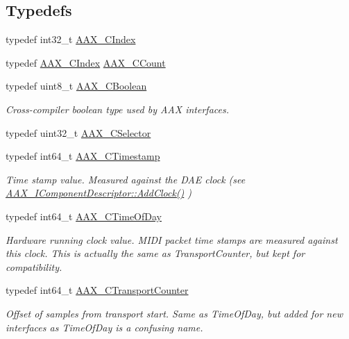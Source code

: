 \subsection*{Typedefs}
\begin{DoxyCompactItemize}
\item 
typedef int32\+\_\+t \hyperlink{a00149_a24ac375fa55ccadbc3126e6d81146c28}{A\+A\+X\+\_\+\+C\+Index}
\item 
typedef \hyperlink{a00149_a24ac375fa55ccadbc3126e6d81146c28}{A\+A\+X\+\_\+\+C\+Index} \hyperlink{a00149_a9a9a14ab1486fa8c6734b96976be3056}{A\+A\+X\+\_\+\+C\+Count}
\item 
typedef uint8\+\_\+t \hyperlink{a00149_aa216506530f1d19a2965931ced2b274b}{A\+A\+X\+\_\+\+C\+Boolean}
\begin{DoxyCompactList}\small\item\em Cross-\/compiler boolean type used by A\+A\+X interfaces. \end{DoxyCompactList}\item 
typedef uint32\+\_\+t \hyperlink{a00149_aeaf9b387f902c50a8360ff423f4a1f23}{A\+A\+X\+\_\+\+C\+Selector}
\item 
typedef int64\+\_\+t \hyperlink{a00149_aae7325dbfa53a983f208a68cb563fba5}{A\+A\+X\+\_\+\+C\+Timestamp}
\begin{DoxyCompactList}\small\item\em Time stamp value. Measured against the D\+A\+E clock (see \hyperlink{a00088_a59727dee1043fcd7f14da130ab254445}{A\+A\+X\+\_\+\+I\+Component\+Descriptor\+::\+Add\+Clock()} ) \end{DoxyCompactList}\item 
typedef int64\+\_\+t \hyperlink{a00149_a46542a1dcccdcc3b4260a9926edf8a2a}{A\+A\+X\+\_\+\+C\+Time\+Of\+Day}
\begin{DoxyCompactList}\small\item\em Hardware running clock value. M\+I\+D\+I packet time stamps are measured against this clock. This is actually the same as Transport\+Counter, but kept for compatibility. \end{DoxyCompactList}\item 
typedef int64\+\_\+t \hyperlink{a00149_ac09cd6857748cc296ac0f8bcc20dc74b}{A\+A\+X\+\_\+\+C\+Transport\+Counter}
\begin{DoxyCompactList}\small\item\em Offset of samples from transport start. Same as Time\+Of\+Day, but added for new interfaces as Time\+Of\+Day is a confusing name. \end{DoxyCompactList}\item 

\end{DoxyCompactItemize}
